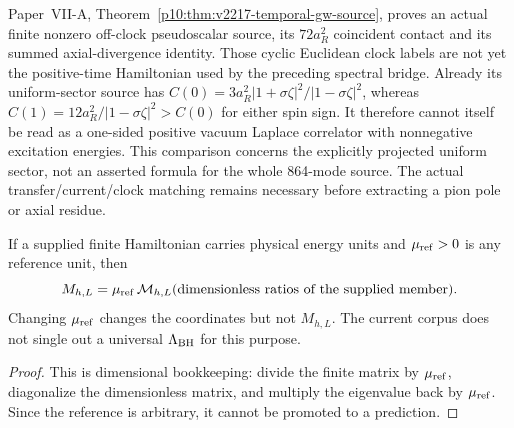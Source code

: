 \documentclass[12pt,a4paper]{article}
\begin{document}
\begin{remark}
\label{p11:rem:v2217-temporal-source-clock}
Paper~VII-A, Theorem~\ref{p10:thm:v2217-temporal-gw-source}, proves an
actual finite nonzero off-clock pseudoscalar source, its $72a_R^2$
coincident contact and its summed axial-divergence identity. Those cyclic
Euclidean clock labels are not yet the positive-time Hamiltonian used by
the preceding spectral bridge. Already its uniform-sector source has
$C(0)=3a_R^2|1+\sigma\zeta|^2/|1-\sigma\zeta|^2$, whereas
$C(1)=12a_R^2/|1-\sigma\zeta|^2>C(0)$ for either spin sign.
It therefore cannot itself be read as a one-sided positive vacuum Laplace
correlator with nonnegative excitation energies. This comparison concerns
the explicitly projected uniform sector, not an asserted formula for the
whole 864-mode source. The actual transfer/current/clock matching remains
necessary before extracting a pion pole or axial residue.
\end{remark}


\begin{proposition}
\label{p11:prop:dimensional-hadron-mass-form}

If a supplied finite Hamiltonian carries physical energy units and \(\mu_{\rm ref}>0\) is any reference unit, then
\[
M_{h,L}=\mu_{\rm ref}\,\mathcal M_{h,L}(\text{dimensionless ratios of the supplied member}).
\]
Changing \(\mu_{\rm ref}\) changes the coordinates but not \(M_{h,L}\).  The current corpus does not single out a universal \(\Lambda_{\rm BH}\) for this purpose.
\label{p11:eq:hadron-mass-dimensional-form}
\end{proposition}
\begin{proof}

This is dimensional bookkeeping: divide the finite matrix by \(\mu_{\rm ref}\), diagonalize the dimensionless matrix, and multiply the eigenvalue back by \(\mu_{\rm ref}\).  Since the reference is arbitrary, it cannot be promoted to a prediction.
\end{proof}
\end{document}
